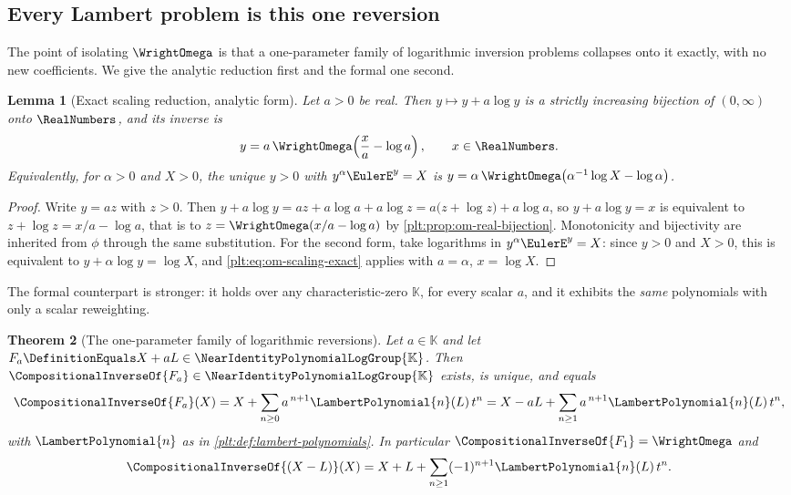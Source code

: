 \documentclass[11pt,oneside]{article}
\theoremstyle{plain}
\newtheorem{theorem}{Theorem}[section]
\newtheorem{lemma}[theorem]{Lemma}
\theoremstyle{definition}
\theoremstyle{remark}
\newcommand{\K}{\mathbb{K}}
\newcommand{\Gnear}{\NearIdentityPolynomialLogGroup{\K}} %
\newcommand{\rev}[1]{\CompositionalInverseOf{#1}}
\newcommand{\LamP}[1]{\LambertPolynomial{#1}}
\begin{document}
\subsection{Every Lambert problem is this one reversion}
\label{plt:sec:om-reduction}

The point of isolating \(\WrightOmega\) is that a one-parameter family of
logarithmic inversion problems collapses onto it exactly, with no new
coefficients.  We give the analytic reduction first and the formal one
second.

\begin{lemma}[Exact scaling reduction, analytic form]
\label{plt:lem:om-scaling-exact}
Let \(a>0\) be real.  Then \(y\mapsto y+a\log y\) is a strictly increasing
bijection of \((0,\infty)\) onto \(\RealNumbers\), and its inverse is
\begin{equation}\label{plt:eq:om-scaling-exact}
 y=a\,\WrightOmega\!\left(\frac{x}{a}-\log a\right),
 \qquad x\in\RealNumbers .
\end{equation}
Equivalently, for \(\alpha>0\) and \(X>0\), the unique \(y>0\) with
\(y^{\alpha}\EulerE^{y}=X\) is
\(y=\alpha\,\WrightOmega\!\left(\alpha^{-1}\log X-\log\alpha\right)\).
\end{lemma}

\begin{proof}
Write \(y=az\) with \(z>0\).  Then
\(y+a\log y=az+a\log a+a\log z=a\bigl(z+\log z\bigr)+a\log a\), so
\(y+a\log y=x\) is equivalent to \(z+\log z=x/a-\log a\), that is to
\(z=\WrightOmega(x/a-\log a)\) by \cref{plt:prop:om-real-bijection}.
Monotonicity and bijectivity are inherited from \(\phi\) through the same
substitution.  For the second form, take logarithms in
\(y^{\alpha}\EulerE^{y}=X\): since \(y>0\) and \(X>0\), this is equivalent to
\(y+\alpha\log y=\log X\), and \eqref{plt:eq:om-scaling-exact} applies with
\(a=\alpha\), \(x=\log X\).
\end{proof}

The formal counterpart is stronger: it holds over any characteristic-zero
\(\K\), for every scalar \(a\), and it exhibits the \emph{same} polynomials
with only a scalar reweighting.

\begin{theorem}[The one-parameter family of logarithmic reversions]
\label{plt:thm:om-alpha-family}
Let \(a\in\K\) and let \(F_a\DefinitionEquals X+aL\in\Gnear\).  Then
\(\rev{F_a}\in\Gnear\) exists, is unique, and equals
\begin{equation}\label{plt:eq:om-alpha-family}
 \rev{F_a}(X)
 =X+\sum_{n\ge0}a^{\,n+1}\LamP{n}(L)\,t^{n}
 =X-aL+\sum_{n\ge1}a^{\,n+1}\LamP{n}(L)\,t^{n},
\end{equation}
with \(\LamP{n}\) as in \cref{plt:def:lambert-polynomials}.  In particular
\(\rev{F_1}=\WrightOmega\) and
\begin{equation}\label{plt:eq:om-minus-log}
 \rev{(X-L)}(X)=X+L+\sum_{n\ge1}(-1)^{n+1}\LamP{n}(L)\,t^{n}.
\end{equation}
\end{theorem}
\end{document}
